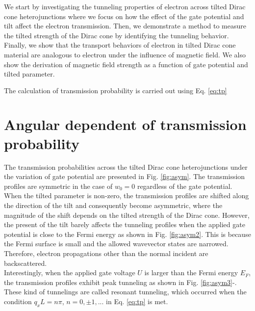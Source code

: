 We start by investigating the tunneling properties of electron across tilted Dirac cone heterojunctions where we focus on how
the effect of the gate potential and tilt affect the electron transmission.  
Then, we demonstrate a method to measure the tilted strength of the Dirac cone by identifying the tunneling behavior.
Finally, we show that the transport behaviors of electron in tilted Dirac cone material are analogous to electron under
the influence of magnetic field. We also show the derivation of magnetic field strength as a function of gate potential and tilted parameter.


The calculation of transmission probability is carried out using Eq. \ref{eq:tp}
\section{Angular dependent of transmission probability} \label{sec:asym}
    The transmission probabilities across the tilted Dirac cone heterojunctions under the variation of gate potential are presented in Fig. \ref{fig:asym}.
    The transmission profiles are symmetric in the case of $w_0 = 0$ regardless of the gate potential. 
    When the tilted parameter is non-zero, the transmission profiles are shifted along the direction of the tilt and consequently become asymmetric, where the magnitude of the shift depends on the tilted strength of the Dirac cone.
    However, the present of the tilt barely affects the tunneling profiles when the applied gate potential is close to the Fermi energy as shown in Fig. \ref{fig:asym2}.
    This is because the Fermi surface is small and the allowed wavevector states are narrowed. Therefore, electron propagations other than the normal incident are backscattered.\\
    
    Interestingly, when the applied gate voltage $U$ is larger than the Fermi energy $E_F$, the transmission profiles exhibit peak tunneling as shown in Fig. \ref{fig:asym3}-.
    These kind of tunnelings are called resonant tunneling, which occurred when the condition $q_x L = n \pi$, $n = 0, \pm1,...$ in Eq. \ref{eq:tp} is met.
    
